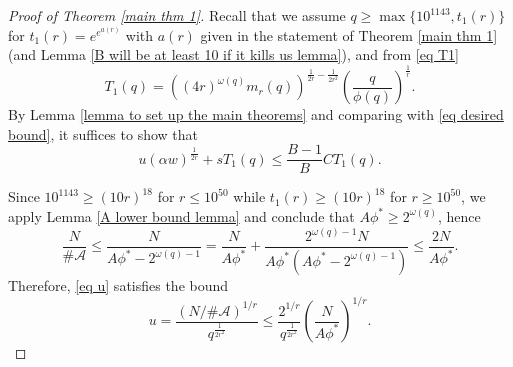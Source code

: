 \documentclass[10pt,a4paper]{amsart}
\newcommand{\cA}{{\mathcal{A}}}
\begin{document}
\begin{proof}[Proof of Theorem \ref{main thm 1}]
Recall that we assume $q\ge \max\{10^{1143}, t_1(r)\}$ for $t_1(r)=e^{e^{a(r)}}$ with $a(r)$ given in the statement of Theorem \ref{main thm 1} (and Lemma \ref{B will be at least 10 if it kills us lemma}), and from
\eqref{eq T1}
$$T_1(q) = \left((4r)^{\omega(q)}m_r(q)\right)^{\frac{1}{2r}-\frac{1}{2r^2}}\left(\frac{q}{\phi(q)}\right)^{\frac{1}{r}}.$$
By Lemma \ref{lemma to set up the main theorems}
and comparing with \eqref{eq desired bound}, it suffices to show that
\begin{equation*}
u(\alpha w)^{\frac{1}{2r}} + sT_1(q) \le \frac{B-1}{B} C T_1(q).
\end{equation*}

Since $10^{1143}\ge (10r)^{18}$ for $r\le 10^{50}$ while $t_1(r) \ge (10r)^{18}$ for $r\ge 10^{50}$, we apply Lemma \ref{A lower bound lemma} and conclude that $A\phi^{*} \ge 2^{\omega(q)}$, hence
$$\frac{N}{\#\mathcal{A}}\le \frac{N}{A\phi^*-2^{\omega(q)-1}}=\frac{N}{A\phi^*}+\frac{2^{\omega(q)-1}N}{A\phi^*(A\phi^*-2^{\omega(q)-1})} \le \frac{2N}{A\phi^{*}}.$$
Therefore, \eqref{eq u} satisfies the bound
\begin{equation} \label{roughly u}
u=\frac{\left(N/\#\cA\right)^{1/{r}}}{q^\frac{1}{2r^2}} \le \frac{2^{1/r}}{q^{\frac{1}{2r^2}}}\left(\frac{N}{A\phi^*}\right)^{1/r}.
\end{equation}


\end{proof}
\end{document}
